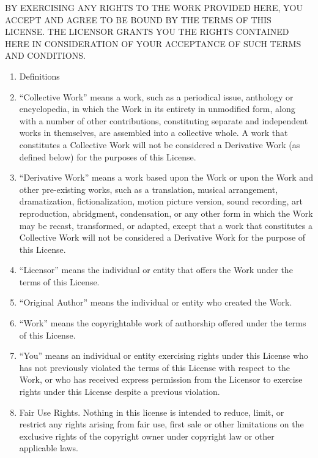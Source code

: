 BY EXERCISING ANY RIGHTS TO THE WORK PROVIDED HERE, YOU ACCEPT AND
AGREE TO BE BOUND BY THE TERMS OF THIS LICENSE. THE LICENSOR GRANTS
YOU THE RIGHTS CONTAINED HERE IN CONSIDERATION OF YOUR ACCEPTANCE
OF SUCH TERMS AND CONDITIONS.

\begin{enumerate}
\item
  Definitions

\item
  ``Collective Work'' means a work, such as a periodical issue,
  anthology or encyclopedia, in which the Work in its entirety in
  unmodified form, along with a number of other contributions,
  constituting separate and independent works in themselves, are
  assembled into a collective whole. A work that constitutes a
  Collective Work will not be considered a Derivative Work (as
  defined below) for the purposes of this License.

\item
  ``Derivative Work'' means a work based upon the Work or upon the
  Work and other pre-existing works, such as a translation, musical
  arrangement, dramatization, fictionalization, motion picture
  version, sound recording, art reproduction, abridgment,
  condensation, or any other form in which the Work may be recast,
  transformed, or adapted, except that a work that constitutes a
  Collective Work will not be considered a Derivative Work for the
  purpose of this License.

\item
  ``Licensor'' means the individual or entity that offers the Work
  under the terms of this License.

\item
  ``Original Author'' means the individual or entity who created the
  Work.

\item
  ``Work'' means the copyrightable work of authorship offered under
  the terms of this License.

\item
  ``You'' means an individual or entity exercising rights under this
  License who has not previously violated the terms of this License
  with respect to the Work, or who has received express permission
  from the Licensor to exercise rights under this License despite a
  previous violation.

\item
  Fair Use Rights. Nothing in this license is intended to reduce,
  limit, or restrict any rights arising from fair use, first sale or
  other limitations on the exclusive rights of the copyright owner
  under copyright law or other applicable laws.


\end{enumerate}
